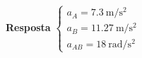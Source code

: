 \begin{flushright}
	\textbf{Resposta}
	$
	\begin{cases}
	a_{A}=\SI{7.3}{\meter/\second^{2}}\\
	a_{B}=\SI{11.27}{\meter/\second^{2}}\\
	a_{AB}=\SI{18}{\radian/\second^{2}}
	\end{cases}
	$
\end{flushright}